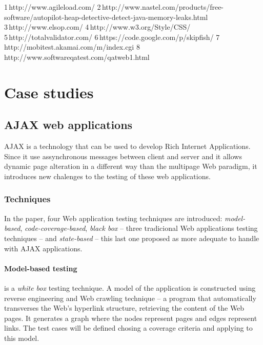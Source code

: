 \documentclass[a4paper]{article}
\begin{document}
\begin {itemize}
   
       1 http://www.agileload.com/ 
       2 http://www.nastel.com/products/free-software/autopilot-heap-detective-detect-java-memory-leaks.html  
       3 http://www.elsop.com/   
       4 http://www.w3.org/Style/CSS/ 
       5 http://totalvalidator.com/ 
       6 https://code.google.com/p/skipfish/ 
       7 http://mobitest.akamai.com/m/index.cgi 
       8 http://www.softwareqatest.com/qatweb1.html 
       
       
        
        
        
         
         
         
          
          


\section{Case studies}

\subsection{AJAX web applications \cite{mtr08}}
AJAX is a technology that can be used to develop Rich Internet Applications.
Since it use assynchronous messages between client and server and it allows dynamic page alteration in a different way than the multipage Web paradigm, it introduces new chalenges to the testing of these web applications.

\subsubsection{Techniques}
In the paper, four Web application testing techniques are introduced: \emph{model-based}, \emph{code-coverage-based}, \emph{black box} -- three tradicional Web applications testing techniques -- and \emph{state-based} -- this last one proposed as more adequate to handle with AJAX applications.

\paragraph{Model-based testing}

is a \emph{white box} testing technique.
A model of the application is constructed using reverse engineering and Web crawling technique -- a program that automatically transverses the Web's hyperlink structure, retrieving the content of the Web pages.
It generates a graph where the nodes represent pages and edges represent links.
The test cases will be defined chosing a coverage criteria and applying to this model. 


\end{itemize}
\end{document}
